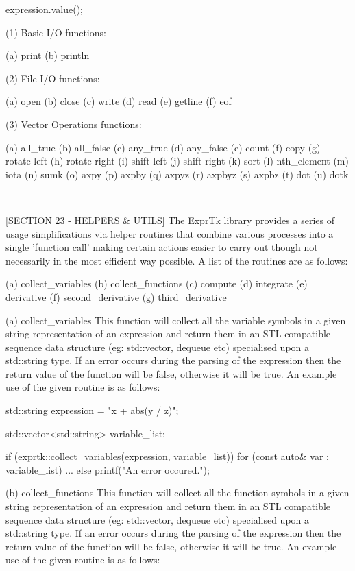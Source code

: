 {expression.value();


(1) Basic I/O functions:

(a) print
(b) println

(2) File I/O functions:

(a) open    (b) close
(c) write   (d) read
(e) getline (f) eof

(3) Vector Operations functions:

(a) all\_true    (b) all\_false
(c) any\_true    (d) any\_false
(e) count       (f) copy
(g) rotate-left (h) rotate-right
(i) shift-left  (j) shift-right
(k) sort        (l) nth\_element
(m) iota        (n) sumk
(o) axpy        (p) axpby
(q) axpyz       (r) axpbyz
(s) axpbz       (t) dot
(u) dotk

~~~~~~~~~~~~~~~~~~~~~~~~~~~~~~~~~~~~~~~~~~~~~~~~~~~~~~~~~~

[SECTION 23 - HELPERS \& UTILS]
The  ExprTk library  provides a  series of  usage simplifications  via
helper routines that combine various processes into a single 'function
call'  making  certain  actions   easier  to  carry  out   though  not
necessarily in the most efficient way possible. A list of the routines
are as follows:

(a) collect\_variables
(b) collect\_functions
(c) compute
(d) integrate
(e) derivative
(f) second\_derivative
(g) third\_derivative


(a) collect\_variables
This function will collect all the variable symbols in a given  string
representation of an expression and  return them in an STL  compatible
sequence  data structure  (eg: std::vector,  dequeue etc)  specialised
upon a std::string type. If an error occurs during the parsing of  the
expression  then  the return  value  of the  function  will be  false,
otherwise it will be  true. An example use  of the given routine is as
follows:

std::string expression = "x + abs(y / z)";

std::vector<std::string> variable\_list;

if (exprtk::collect\_variables(expression, variable\_list))
{
	for (const auto\& var : variable\_list)
	{
		...
	}
}
else
printf("An error occured.");


(b) collect\_functions
This function will collect all the function symbols in a given  string
representation of an expression and  return them in an STL  compatible
sequence  data structure  (eg: std::vector,  dequeue etc)  specialised
upon a std::string type. If an error occurs during the parsing of  the
expression  then  the return  value  of the  function  will be  false,
otherwise it  will be true. An example  use of the given routine is as
follows:

}

